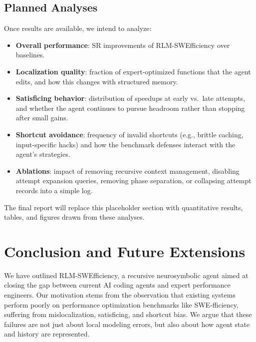 \documentclass{article}
\theoremstyle{plain}
\theoremstyle{definition}
\theoremstyle{remark}
\begin{document}
\subsection{Planned Analyses}
Once results are available, we intend to analyze:
\begin{itemize}
    \item \textbf{Overall performance}: SR improvements of RLM-SWEfficiency over baselines.
    \item \textbf{Localization quality}: fraction of expert-optimized functions that the agent edits, and how this changes with structured memory.
    \item \textbf{Satisficing behavior}: distribution of speedups at early vs.\ late attempts, and whether the agent continues to pursue headroom rather than stopping after small gains.
    \item \textbf{Shortcut avoidance}: frequency of invalid shortcuts (e.g., brittle caching, input-specific hacks) and how the benchmark defenses interact with the agent's strategies.
    \item \textbf{Ablations}: impact of removing recursive context management, disabling attempt expansion queries, removing phase separation, or collapsing attempt records into a simple log.
\end{itemize}

The final report will replace this placeholder section with quantitative results, tables, and figures drawn from these analyses.

\section{Conclusion and Future Extensions}
\label{sec:conclusion}
We have outlined RLM-SWEfficiency, a recursive neurosymbolic agent aimed at closing the gap between current AI coding agents and expert performance engineers. Our motivation stems from the observation that existing systems perform poorly on performance optimization benchmarks like SWE-fficiency, suffering from mislocalization, satisficing, and shortcut bias. We argue that these failures are not just about local modeling errors, but also about how agent state and history are represented.
\end{document}
